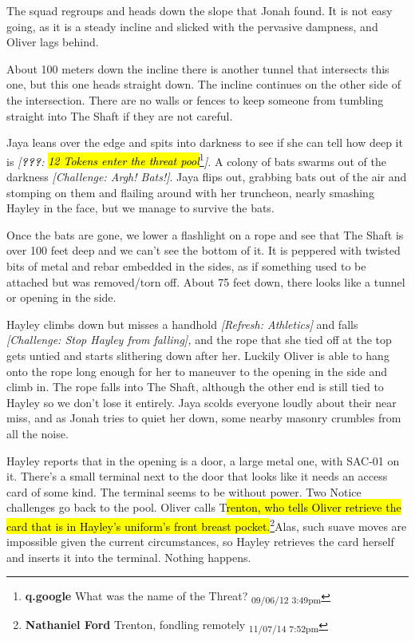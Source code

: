 The squad regroups and heads down the slope that Jonah found.  It is not easy going, as it is a steady incline and slicked with the pervasive dampness, and Oliver lags behind.



About 100 meters down the incline there is another tunnel that intersects this one, but this one heads straight down.  The incline continues on the other side of the intersection.  There are no walls or fences to keep someone from tumbling straight into The Shaft if they are not careful.  



Jaya leans over the edge and spits into darkness to see if she can tell how deep it is \textit{{[}}\textit{\textbf{???}}\textit{: }\textit{\hl{12 Tokens enter the threat pool}}\footnote{\textbf{q.google }What was the name of the Threat? \textsubscript{09/06/12 3:49pm}}\textit{{]}.}   A colony of bats swarms out of the darkness \textit{{[}Challenge: Argh!  Bats!{]}}.  Jaya flips out, grabbing bats out of the air and stomping on them and flailing around with her truncheon, nearly smashing Hayley in the face, but we manage to survive the bats.  



Once the bats are gone, we lower a flashlight on a rope and see that The Shaft is over 100 feet deep and we can't see the bottom of it.  It is peppered with twisted bits of metal and rebar embedded in the sides, as if something used to be attached but was removed/torn off.  About 75 feet down, there looks like a tunnel or opening in the side.



Hayley climbs down but misses a handhold \textit{{[}Refresh: Athletics{]}} and falls \textit{{[}Challenge: Stop Hayley from falling{]},} and the rope that she tied off at the top gets untied and starts slithering down after her.  Luckily Oliver is able to hang onto the rope long enough for her to maneuver to the opening in the side and climb in.  The rope falls into The Shaft, although the other end is still tied to Hayley so we don't lose it entirely.  Jaya scolds everyone loudly about their near miss, and as Jonah tries to quiet her down, some nearby masonry crumbles from all the noise.



Hayley reports that in the opening is a door, a large metal one, with SAC-01 on it.  There's a small terminal next to the door that looks like it needs an access card of some kind.  The terminal seems to be without power.  Two Notice challenges go back to the pool.  Oliver calls T\hl{renton, who tells Oliver retrieve the card that is in Hayley's uniform's front breast pocket.}\footnote{\textbf{Nathaniel Ford }Trenton, fondling remotely \textsubscript{11/07/14 7:52pm}}Alas, such suave moves are impossible given the current circumstances, so Hayley retrieves the card herself and inserts it into the terminal.  Nothing happens.




